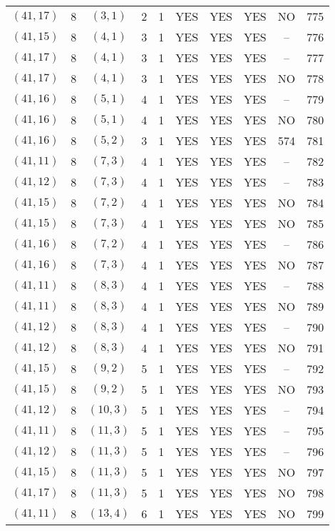 \begin{longtable}{|c|c|c|c|c|c|c|c|c|c|}
$(41, 17)$ & 8 & $(3, 1)$ & 2 & 1 & YES & YES & YES & NO & 775\\
$(41, 15)$ & 8 & $(4, 1)$ & 3 & 1 & YES & YES & YES & -- & 776\\
$(41, 17)$ & 8 & $(4, 1)$ & 3 & 1 & YES & YES & YES & -- & 777\\
$(41, 17)$ & 8 & $(4, 1)$ & 3 & 1 & YES & YES & YES & NO & 778\\
$(41, 16)$ & 8 & $(5, 1)$ & 4 & 1 & YES & YES & YES & -- & 779\\
$(41, 16)$ & 8 & $(5, 1)$ & 4 & 1 & YES & YES & YES & NO & 780\\
$(41, 16)$ & 8 & $(5, 2)$ & 3 & 1 & YES & YES & YES & 574 & 781\\
$(41, 11)$ & 8 & $(7, 3)$ & 4 & 1 & YES & YES & YES & -- & 782\\
$(41, 12)$ & 8 & $(7, 3)$ & 4 & 1 & YES & YES & YES & -- & 783\\
$(41, 15)$ & 8 & $(7, 2)$ & 4 & 1 & YES & YES & YES & NO & 784\\
$(41, 15)$ & 8 & $(7, 3)$ & 4 & 1 & YES & YES & YES & NO & 785\\
$(41, 16)$ & 8 & $(7, 2)$ & 4 & 1 & YES & YES & YES & -- & 786\\
$(41, 16)$ & 8 & $(7, 3)$ & 4 & 1 & YES & YES & YES & NO & 787\\
$(41, 11)$ & 8 & $(8, 3)$ & 4 & 1 & YES & YES & YES & -- & 788\\
$(41, 11)$ & 8 & $(8, 3)$ & 4 & 1 & YES & YES & YES & NO & 789\\
$(41, 12)$ & 8 & $(8, 3)$ & 4 & 1 & YES & YES & YES & -- & 790\\
$(41, 12)$ & 8 & $(8, 3)$ & 4 & 1 & YES & YES & YES & NO & 791\\
$(41, 15)$ & 8 & $(9, 2)$ & 5 & 1 & YES & YES & YES & -- & 792\\
$(41, 15)$ & 8 & $(9, 2)$ & 5 & 1 & YES & YES & YES & NO & 793\\
$(41, 12)$ & 8 & $(10, 3)$ & 5 & 1 & YES & YES & YES & -- & 794\\
$(41, 11)$ & 8 & $(11, 3)$ & 5 & 1 & YES & YES & YES & -- & 795\\
$(41, 12)$ & 8 & $(11, 3)$ & 5 & 1 & YES & YES & YES & -- & 796\\
$(41, 15)$ & 8 & $(11, 3)$ & 5 & 1 & YES & YES & YES & NO & 797\\
$(41, 17)$ & 8 & $(11, 3)$ & 5 & 1 & YES & YES & YES & NO & 798\\
$(41, 11)$ & 8 & $(13, 4)$ & 6 & 1 & YES & YES & YES & NO & 799\\

\end{longtable}
